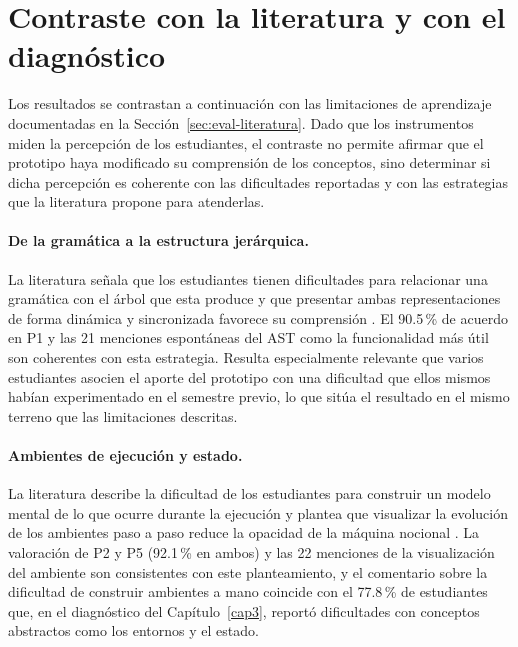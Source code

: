 \section{Contraste con la literatura y con el diagnóstico}
\label{sec:eval-contraste}

Los resultados se contrastan a continuación con las limitaciones de aprendizaje documentadas en la Sección~\ref{sec:eval-literatura}. Dado que los instrumentos miden la percepción de los estudiantes, el contraste no permite afirmar que el prototipo haya modificado su comprensión de los conceptos, sino determinar si dicha percepción es coherente con las dificultades reportadas y con las estrategias que la literatura propone para atenderlas.

\paragraph{De la gramática a la estructura jerárquica.} La literatura señala que los estudiantes tienen dificultades para relacionar una gramática con el árbol que esta produce y que presentar ambas representaciones de forma dinámica y sincronizada favorece su comprensión \cite{jovanovic2021comvis, Stamenkovic2024AWE, delvado2023itt}. El 90.5\,\% de acuerdo en P1 y las 21 menciones espontáneas del AST como la funcionalidad más útil son coherentes con esta estrategia. Resulta especialmente relevante que varios estudiantes asocien el aporte del prototipo con una dificultad que ellos mismos habían experimentado en el semestre previo, lo que sitúa el resultado en el mismo terreno que las limitaciones descritas.

\paragraph{Ambientes de ejecución y estado.} La literatura describe la dificultad de los estudiantes para construir un modelo mental de lo que ocurre durante la ejecución y plantea que visualizar la evolución de los ambientes paso a paso reduce la opacidad de la máquina nocional \cite{sorva2013notional, Cai2023VisualizingEnvironments, Abad2024BeyondSICP}. La valoración de P2 y P5 (92.1\,\% en ambos) y las 22 menciones de la visualización del ambiente son consistentes con este planteamiento, y el comentario sobre la dificultad de construir ambientes a mano coincide con el 77.8\,\% de estudiantes que, en el diagnóstico del Capítulo~\ref{cap3}, reportó dificultades con conceptos abstractos como los entornos y el estado.

